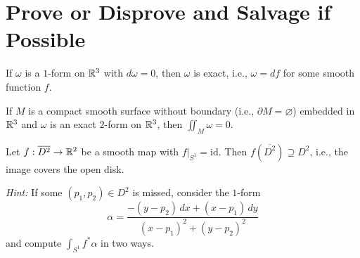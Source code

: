\documentclass{homework}
\begin{document}
\section{Prove or Disprove and Salvage if Possible}

\begin{problem}
  If $\omega$ is a $1$-form on $\mathbb{R}^3$ with $d\omega = 0$, then $\omega$ is exact, i.e., $\omega = df$ for some smooth function $f$.
\end{problem}

\begin{problem}
  If $M$ is a compact smooth surface without boundary (i.e., $\partial M = \varnothing$) embedded in $\mathbb{R}^3$ and $\omega$ is an exact $2$-form on $\mathbb{R}^3$, then $\displaystyle\iint_M \omega = 0$.
\end{problem}

\begin{problem}
  Let $f:\overline{D^2}\to\mathbb{R}^2$ be a smooth map with $f|_{S^1}=\mathrm{id}$. Then $f(\overline{D^2})\supseteq D^2$, i.e., the image covers the open disk.
  
  \textit{Hint:} If some $(p_1,p_2) \in D^2$ is missed, consider the $1$-form
  \[
    \alpha = \dfrac{-( y-p_2)\,dx+(x-p_1)\,dy}{(x-p_1)^2+(y-p_2)^2}
  \]
  and compute $\int_{S^1} f^*\alpha$ in two ways.
\end{problem}
\end{document}
